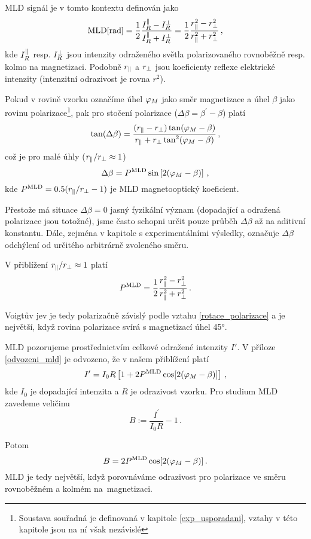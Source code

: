 MLD signál je v tomto kontextu definován jako \cite{Tesarova}
\begin{equation}
\text{MLD}[\si{\radian}]=\frac{1}{2}\frac{I_R^\parallel - I_R^\perp}{I_R^\parallel + I_R^\perp}=\frac{1}{2}\frac{r^2_\parallel-r^2_\perp}{r^2_\parallel+r^2_\perp} \,,
\end{equation}
kde $I_R^\parallel$ resp. $I_R^\perp$ jsou intenzity odraženého světla polarizovaného rovnoběžně resp. kolmo na magnetizaci. Podobně $r_\parallel$ a $r_\perp$ jsou koeficienty reflexe elektrické intenzity (intenzitní odrazivost je rovna $r^2$).

Pokud v rovině vzorku označíme úhel $\varphi_M$ jako směr magnetizace a úhel $\beta$ jako rovinu polarizace\footnote{Soustava souřadná je definovaná v kapitole \ref{exp_usporadani}, vztahy v této kapitole jsou na ní však nezávislé}, pak pro stočení polarizace ($\Delta\beta=\beta^\prime-\beta$) platí \cite{Tesarova} 
\begin{equation}
\tan(\Delta \beta)=\frac{(r_\parallel-r_\perp)\tan(\varphi_M-\beta)}{r_\parallel + r_\perp \tan^2(\varphi_M-\beta)} \,,
\end{equation}
což je pro malé úhly ($r_\parallel /r_\perp \approx 1$)
\begin{equation} \label{rotace_polarizace}
\Delta \beta = P^{\text{MLD}} \sin \left[ 2(\varphi_M-\beta) \right] \,,
\end{equation}
kde $P^{\text{MLD}}=\num{0.5}(r_\parallel/r_\perp -1)$ je MLD magnetooptický koeficient.

Přestože má situace $\Delta\beta=0$ jasný fyzikální význam (dopadající a odražená polarizace jsou totožné), jsme často schopni určit pouze průběh $\Delta\beta$ až na aditivní konstantu. Dále, zejména v kapitole s experimentálními výsledky, označuje $\Delta\beta$ odchýlení od určitého arbitrárně zvoleného směru.

V přiblížení $r_\parallel /r_\perp \approx 1$ platí
\begin{equation}
P^{\text{MLD}}=\frac{1}{2}\frac{r^2_\parallel-r^2_\perp}{r^2_\parallel+r^2_\perp} \,.
\end{equation}

Voigtův jev je tedy polarizačně závislý podle vztahu \eqref{rotace_polarizace} a je největší, když rovina polarizace svírá s magnetizací úhel \ang{45}.

MLD pozorujeme prostřednictvím celkové odražené intenzity $I'$. V příloze \ref{odvozeni_mld} je odvozeno, že v našem přiblížení platí
\begin{equation}
I^\prime=I_0 R \left[1 + 2P^{\text{MLD}} \cos[2(\varphi_M-\beta)]\right] \,,
\end{equation}
kde $I_0$ je dopadající intenzita a $R$ je odrazivost vzorku.
Pro studium MLD zavedeme veličinu
\begin{equation} \label{e:Bdef}
B:=\frac{I^\prime}{I_0 R}-1 \,.
\end{equation}

Potom
\begin{equation}
B=2P^{\text{MLD}} \cos[2(\varphi_M-\beta)] \,.
\end{equation}
MLD je tedy největší, když porovnáváme odrazivost pro polarizace ve směru rovnoběžném a kolmém na~magnetizaci.